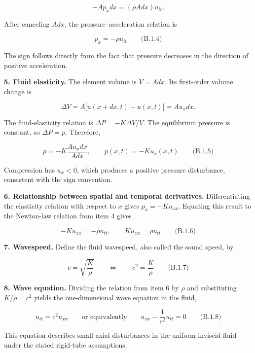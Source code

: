 \[
-A p_xd x=(\rho A d x)u_{tt}.
\]

After canceling $A d x$, the pressure--acceleration relation is

\[
\boxed{p_x=-\rho u_{tt}}\qquad\text{(B.1.4)}
\]

The sign follows directly from the fact that pressure decreases in the direction of positive acceleration.

\textbf{5. Fluid elasticity.} The element volume is $V=A d x$. Its first-order volume change is

\[
\Delta V=A\bigl[u(x+d x,t)-u(x,t)\bigr]=A u_xd x.
\]

The fluid-elasticity relation is $\Delta P=-K\Delta V/V$. The equilibrium pressure is constant, so $\Delta P=p$. Therefore,

\[
p=-K\frac{A u_xd x}{A d x},
\qquad
\boxed{p(x,t)=-K u_x(x,t)}\qquad\text{(B.1.5)}
\]

Compression has $u_x<0$, which produces a positive pressure disturbance, consistent with the sign convention.

\textbf{6. Relationship between spatial and temporal derivatives.} Differentiating the elasticity relation with respect to $x$ gives $p_x=-K u_{xx}$. Equating this result to the Newton-law relation from item 4 gives

\[
-K u_{xx}=-\rho u_{tt},
\qquad
\boxed{K u_{xx}=\rho u_{tt}}\qquad\text{(B.1.6)}
\]

\textbf{7. Wavespeed.} Define the fluid wavespeed, also called the sound speed, by

\[
\boxed{c=\sqrt{\frac{K}{\rho}}}
\qquad\Longleftrightarrow\qquad
\boxed{c^2=\frac{K}{\rho}}\qquad\text{(B.1.7)}
\]

\textbf{8. Wave equation.} Dividing the relation from item 6 by $\rho$ and substituting $K/\rho=c^2$ yields the one-dimensional wave equation in the fluid,

\[
\boxed{u_{tt}=c^2u_{xx}}
\qquad\text{or equivalently}\qquad
\boxed{u_{xx}-\frac{1}{c^2}u_{tt}=0}\qquad\text{(B.1.8)}
\]

This equation describes small axial disturbances in the uniform inviscid fluid under the stated rigid-tube assumptions.

